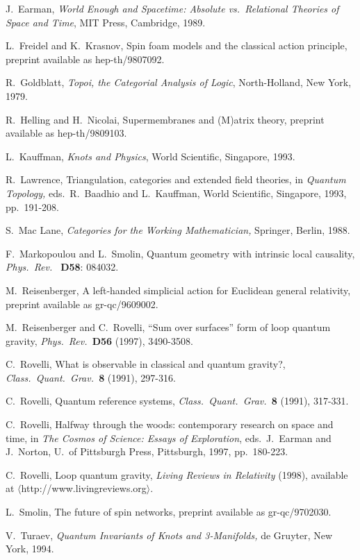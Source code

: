 \documentclass[12pt,amsfonts]{article}
\begin{document}
\begin{thebibliography}{99}
 J.\ Earman, {\sl World Enough and Spacetime: Absolute
vs.\ Relational Theories of Space and Time}, MIT Press, Cambridge, 1989.

 L.\ Freidel and K.\ Krasnov, Spin foam models and the
classical action principle, preprint available as hep-th/9807092. 

 R.\ Goldblatt, {\sl Topoi, the Categorial Analysis 
of Logic}, North-Holland, New York, 1979.

 R.\ Helling and H.\ Nicolai, Supermembranes and (M)atrix
theory, preprint available as hep-th/9809103.

 L.\ Kauffman, {\sl Knots and Physics}, World
Scientific, Singapore, 1993.

 R.\ Lawrence,  Triangulation, categories and extended field
theories, in {\sl Quantum Topology,} eds.\ R.\ Baadhio and L.\ Kauffman,
World Scientific, Singapore, 1993, pp.\ 191-208.

 S.\ Mac Lane, {\sl Categories for the Working
Mathematician,} Springer, Berlin, 1988.

 F.\ Markopoulou and L.\ Smolin, 
Quantum geometry with intrinsic local causality, {\sl Phys.\ Rev.\ } 
{\bf D58}: 084032.

 M.\ Reisenberger, A left-handed simplicial action for
Euclidean general relativity, preprint available as gr-qc/9609002.  

 M.\ Reisenberger and C.\ Rovelli, ``Sum over surfaces''
form of loop quantum gravity, {\sl Phys.\ Rev.\ }{\bf D56} (1997), 
3490-3508. 

 C.\ Rovelli, What is observable in classical and
quantum gravity?, {\sl Class.\ Quant.\ Grav.\ }{\bf 8} (1991), 297-316. 

 C.\ Rovelli, Quantum reference systems, 
{\sl Class.\ Quant.\ Grav.\ }{\bf 8} (1991), 317-331.

 C.\ Rovelli, Halfway through the woods: contemporary
research on space and time, in {\sl The Cosmos of Science: Essays of
Exploration}, eds.\ J.\ Earman and J.\ Norton, U.\ of Pittsburgh Press,
Pittsburgh, 1997, pp.\ 180-223.

 C.\ Rovelli, Loop quantum gravity, {\sl Living
Reviews in Relativity} (1998), available at
$\langle$http://www.livingreviews.org$\rangle$. 

 L.\ Smolin, The future of spin networks, preprint
available as gr-qc/9702030.

 V.\ Turaev, {\sl Quantum Invariants of Knots and
3-Manifolds,} de Gruyter, New York, 1994.

\end{thebibliography}
\end{document}
